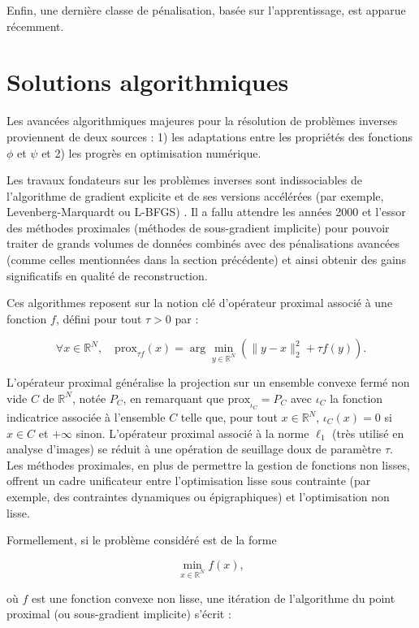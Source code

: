 \documentclass[a4paper, 12pt]{article} %
\begin{document}
Enfin, une dernière classe de pénalisation, basée sur l'apprentissage, est apparue récemment.
\section{Solutions algorithmiques}
Les avancées algorithmiques majeures pour la résolution de problèmes inverses proviennent de deux sources : 1) les adaptations entre les propriétés des fonctions \(\phi\) et \(\psi\) et 2) les progrès en optimisation numérique. 

Les travaux fondateurs sur les problèmes inverses sont indissociables de l’algorithme de gradient explicite et de ses versions accélérées (par exemple, Levenberg-Marquardt ou L-BFGS) \cite{30}. Il a fallu attendre les années 2000 et l’essor des méthodes proximales \cite{3,10,2} (méthodes de sous-gradient implicite) pour pouvoir traiter de grands volumes de données combinés avec des pénalisations avancées (comme celles mentionnées dans la section précédente) et ainsi obtenir des gains significatifs en qualité de reconstruction. 

Ces algorithmes reposent sur la notion clé d’opérateur proximal \cite{23} associé à une fonction \(f\), défini pour tout \(\tau > 0\) par :

\[
\forall x \in \mathbb{R}^N, \quad \text{prox}_{\tau f}(x) = \arg \min_{y \in \mathbb{R}^N} \left( \|y - x\|_2^2 + \tau f(y) \right). \tag{5}
\]

L’opérateur proximal généralise la projection sur un ensemble convexe fermé non vide \(C\) de \(\mathbb{R}^N\), notée \(P_C\), en remarquant que \(\text{prox}_{\iota_C} = P_C\) avec \(\iota_C\) la fonction indicatrice associée à l’ensemble \(C\) telle que, pour tout \(x \in \mathbb{R}^N\), \(\iota_C(x) = 0\) si \(x \in C\) et \(+\infty\) sinon. L’opérateur proximal associé à la norme \(\ell_1\) (très utilisé en analyse d’images) se réduit à une opération de seuillage doux de paramètre \(\tau\).\\
Les méthodes proximales, en plus de permettre la gestion de fonctions non lisses, offrent un cadre unificateur entre l'optimisation lisse sous contrainte (par exemple, des contraintes dynamiques ou épigraphiques) et l'optimisation non lisse. 

Formellement, si le problème considéré est de la forme 

\[
\min_{x \in \mathbb{R}^N} f(x),
\]

où \(f\) est une fonction convexe non lisse, une itération de l'algorithme du point proximal (ou sous-gradient implicite) s'écrit :
\end{document}
